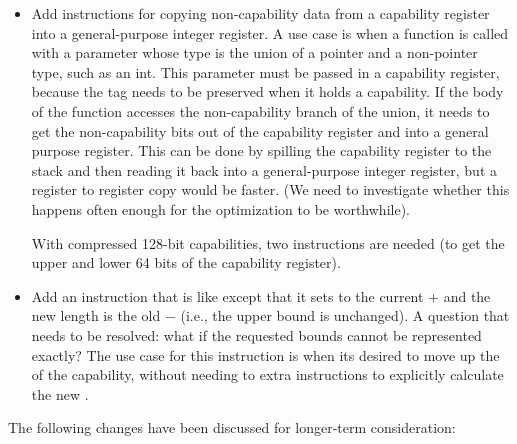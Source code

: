 \begin{itemize}
\item
  Add instructions for copying non-capability data from a capability register
  into a general-purpose integer register. A use case is when a function is called
  with a parameter whose type is the union of a pointer and a non-pointer type,
  such as an int. This parameter must be passed in a capability register, because
  the tag needs to be preserved when it holds a capability. If the body of
  the function accesses the non-capability branch of the union, it needs to
  get the non-capability bits out of the capability register and into a general
  purpose register. This can be done by spilling the capability register to the
  stack and then reading it back into a general-purpose integer register, but a register
  to register copy would be faster. (We need to investigate whether this happens
  often enough for the optimization to be worthwhile).

  With compressed 128-bit capabilities, two instructions are needed (to get
  the upper and lower 64 bits of the capability register).

\item
  Add an instruction that is like  except that it
  sets \cbase{} to the current \cbase{} $+$ \coffset{} and the new length
  is the old \clength{} $-$ \coffset{} (i.e., the upper bound is unchanged).
  A question that needs to be resolved: what if the requested bounds cannot
  be represented exactly? The use case for this instruction is when its
  desired to move up the \cbase{} of the capability, without needing to
  extra instructions to explicitly calculate the new \clength{}.
\end{itemize}

The following changes have been discussed for longer-term consideration:

